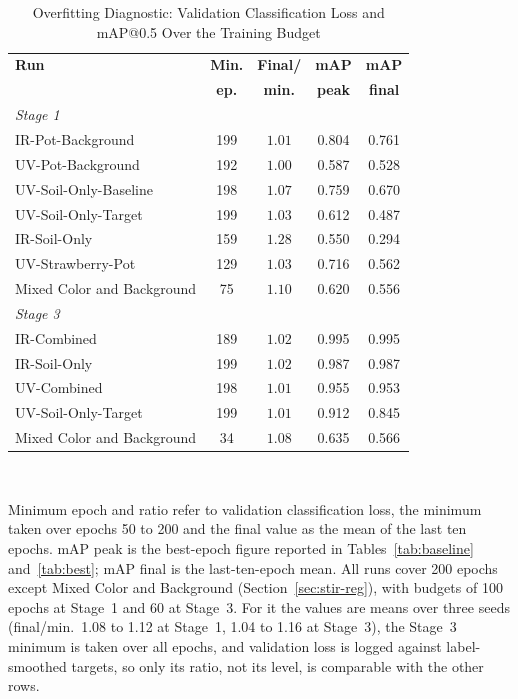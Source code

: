 ﻿\documentclass[journal]{IEEEtran}
\begin{document}
\begin{table}[!t]
\renewcommand{\arraystretch}{1.3}
\caption{Overfitting Diagnostic: Validation Classification Loss and mAP@0.5 Over the Training Budget}
\label{tab:overfit}
\centering
\footnotesize
\setlength{\tabcolsep}{3.5pt}
\begin{tabular}{l c c c c}
\toprule
\textbf{Run} & \textbf{Min.} & \textbf{Final/} & \textbf{mAP} & \textbf{mAP} \\
 & \textbf{ep.} & \textbf{min.} & \textbf{peak} & \textbf{final} \\
\midrule
\multicolumn{5}{l}{\emph{Stage 1}} \\
IR-Pot-Background & 199 & $1.01$ & 0.804 & 0.761 \\
UV-Pot-Background & 192 & $1.00$ & 0.587 & 0.528 \\
UV-Soil-Only-Baseline & 198 & $1.07$ & 0.759 & 0.670 \\
UV-Soil-Only-Target & 199 & $1.03$ & 0.612 & 0.487 \\
IR-Soil-Only & 159 & $1.28$ & 0.550 & 0.294 \\
UV-Strawberry-Pot & 129 & $1.03$ & 0.716 & 0.562 \\
Mixed Color and Background & 75 & $1.10$ & 0.620 & 0.556 \\
\midrule
\multicolumn{5}{l}{\emph{Stage 3}} \\
IR-Combined & 189 & $1.02$ & 0.995 & 0.995 \\
IR-Soil-Only & 199 & $1.02$ & 0.987 & 0.987 \\
UV-Combined & 198 & $1.01$ & 0.955 & 0.953 \\
UV-Soil-Only-Target & 199 & $1.01$ & 0.912 & 0.845 \\
Mixed Color and Background & 34 & $1.08$ & 0.635 & 0.566 \\
\bottomrule
\end{tabular}
\\[2pt]
\parbox{\columnwidth}{\footnotesize Minimum epoch and ratio refer to validation classification loss, the minimum taken over epochs 50 to 200 and the final value as the mean of the last ten epochs. mAP peak is the best-epoch figure reported in Tables~\ref{tab:baseline} and~\ref{tab:best}; mAP final is the last-ten-epoch mean. All runs cover 200 epochs except Mixed Color and Background (Section~\ref{sec:stir-reg}), with budgets of 100 epochs at Stage~1 and 60 at Stage~3. For it the values are means over three seeds (final/min.\ 1.08 to 1.12 at Stage~1, 1.04 to 1.16 at Stage~3), the Stage~3 minimum is taken over all epochs, and validation loss is logged against label-smoothed targets, so only its ratio, not its level, is comparable with the other rows.}
\end{table}
\end{document}
